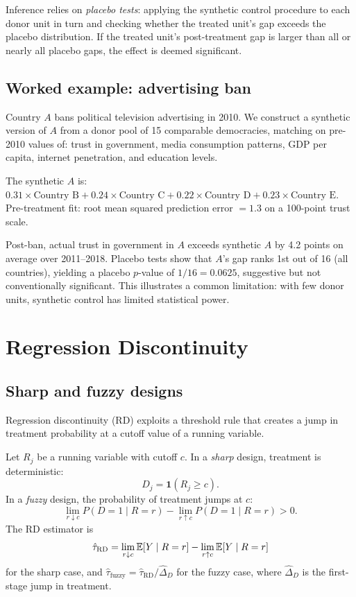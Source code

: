 Inference relies on \emph{placebo tests}: applying the synthetic control procedure to each donor unit in turn and checking whether the treated unit's gap exceeds the placebo distribution.
If the treated unit's post-treatment gap is larger than all or nearly all placebo gaps, the effect is deemed significant.

\subsection{Worked example: advertising ban}

\begin{example}
\label{ex:synth-adban}
Country $A$ bans political television advertising in 2010.
We construct a synthetic version of $A$ from a donor pool of 15 comparable democracies, matching on pre-2010 values of: trust in government, media consumption patterns, GDP per capita, internet penetration, and education levels.

The synthetic $A$ is: $0.31 \times \text{Country B} + 0.24 \times \text{Country C} + 0.22 \times \text{Country D} + 0.23 \times \text{Country E}$.
Pre-treatment fit: root mean squared prediction error $= 1.3$ on a 100-point trust scale.

Post-ban, actual trust in government in $A$ exceeds synthetic $A$ by 4.2 points on average over 2011--2018.
Placebo tests show that $A$'s gap ranks 1st out of 16 (all countries), yielding a placebo $p$-value of $1/16 = 0.0625$, suggestive but not conventionally significant.
This illustrates a common limitation: with few donor units, synthetic control has limited statistical power.
\end{example}

\section{Regression Discontinuity}
\label{sec:ch16-rd}

\subsection{Sharp and fuzzy designs}

Regression discontinuity (RD) exploits a threshold rule that creates a jump in treatment probability at a cutoff value of a running variable.

\begin{definition}
\label{def:rd}
Let $R_j$ be a running variable with cutoff $c$.
In a \emph{sharp} design, treatment is deterministic:
\[
  D_j = \mathbf{1}(R_j \geq c).
\]
In a \emph{fuzzy} design, the probability of treatment jumps at $c$:
\[
  \lim_{r \downarrow c} P(D = 1 \mid R = r) - \lim_{r \uparrow c} P(D = 1 \mid R = r) > 0.
\]
The RD estimator is
\[
  \hat{\tau}_{\text{RD}} = \lim_{r \downarrow c} \mathbb{E}[Y \mid R = r] - \lim_{r \uparrow c} \mathbb{E}[Y \mid R = r]
\]
for the sharp case, and $\hat{\tau}_{\text{fuzzy}} = \hat{\tau}_{\text{RD}} / \hat{\Delta}_D$ for the fuzzy case, where $\hat{\Delta}_D$ is the first-stage jump in treatment.
\end{definition}

